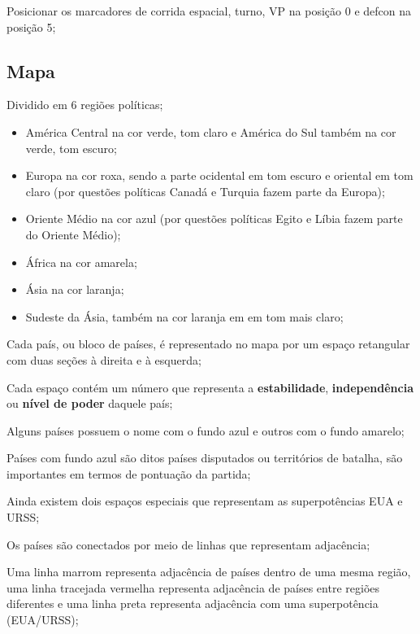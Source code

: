 \documentclass[11pt]{article}
\begin{document}
Posicionar os marcadores de corrida espacial, turno, VP na posição 0 e defcon na posição 5;

\subsection{Mapa}
\label{sec:orgb43f601}

Dividido em 6 regiões políticas;

\begin{itemize}
\item América Central na cor verde, tom claro e América do Sul também na cor verde, tom escuro;

\item Europa na cor roxa, sendo a parte ocidental em tom escuro e oriental em tom claro (por questões políticas Canadá e Turquia fazem parte da Europa);

\item Oriente Médio na cor azul (por questões políticas Egito e Líbia fazem parte do Oriente Médio);

\item África na cor amarela;

\item Ásia na cor laranja;

\item Sudeste da Ásia, também na cor laranja em em tom mais claro;
\end{itemize}

Cada país, ou bloco de países, é representado no mapa por um espaço retangular com duas seções à direita e à esquerda;

Cada espaço contém um número que representa a \textbf{estabilidade}, \textbf{independência} ou \textbf{nível de poder} daquele país;

Alguns países possuem o nome com o fundo azul e outros com o fundo amarelo;

Países com fundo azul são ditos países disputados ou territórios de batalha, são importantes em termos de pontuação da partida;

Ainda existem dois espaços especiais que representam as superpotências EUA e URSS;

Os países são conectados por meio de linhas que representam adjacência;

Uma linha marrom representa adjacência de países dentro de uma mesma região, uma linha tracejada vermelha representa adjacência de países entre regiões diferentes e uma linha preta representa adjacência com uma superpotência (EUA/URSS);
\end{document}
